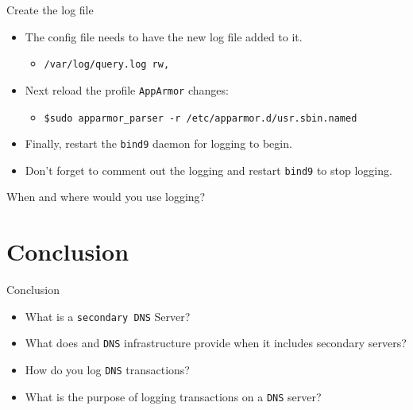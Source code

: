 \documentclass[xcolor=table,aspectratio=169]{beamer}
\begin{document}
\begin{frame}{Create the log file}
  \begin{itemize}
    \item The config file needs to have the new log file added to it.
      \begin{itemize}
        \item \texttt{/var/log/query.log rw,}
      \end{itemize}
    \item Next reload the profile \texttt{AppArmor} changes:
      \begin{itemize}
        \item \scriptsize\texttt{\$sudo apparmor\_parser -r /etc/apparmor.d/usr.sbin.named}
      \end{itemize}
    \item Finally, restart the \texttt{bind9} daemon for logging to begin.
    \item Don't forget to comment out the logging and restart \texttt{bind9} to stop logging.
  \end{itemize}
  \begin{tcolorbox}[title={\textbf{CONSIDER:}}]
    \begin{center}
      When and where would you use logging?
    \end{center}
\end{tcolorbox}
\end{frame}

\section*{Conclusion}
\begin{frame}{Conclusion}
  \begin{itemize}
    \item What is a \texttt{secondary DNS} Server?
    \item What does and \texttt{DNS} infrastructure provide when it includes secondary servers?
    \item How do you log \texttt{DNS} transactions?
    \item What is the purpose of logging transactions on a \texttt{DNS} server?
  \end{itemize}
\end{frame}
\end{document}
